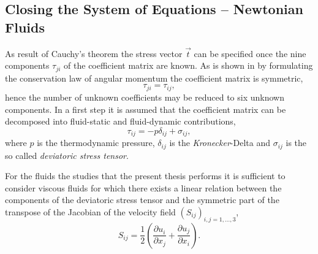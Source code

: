     \subsection{Closing the System of Equations -- Newtonian Fluids}
    \label{sec:fundclosing}

    As result of Cauchy's theorem the stress vector \( \vec{t} \) can be specified once the nine components \(\tau_{ji}\) of the coefficient matrix are known. As is shown in \cite{kundu12,spurk10} by formulating the conservation law of angular momentum the coefficient matrix is symmetric, 
    \begin{equation}
      \label{eq:stresssymetry}
      \tau_{ji} = \tau_{ij},
    \end{equation}
    hence the number of unknown coefficients may be reduced to six unknown components. In a first step it is assumed that the coefficient matrix can be decomposed into fluid-static and fluid-dynamic contributions,
    \begin{displaymath}
      \tau_{ij} = -p \delta_{ij} + \sigma_{ij},
    \end{displaymath}
    where \(p\) is the thermodynamic pressure, \(\delta_{ij}\) is the \emph{Kronecker}-Delta and \( \sigma_{ij} \) is the so called \emph{deviatoric stress tensor}. 
    
    For the fluids the studies that the present thesis performs it is sufficient to consider viscous fluids for which there exists a linear relation between the components of the deviatoric stress tensor and the symmetric part of the transpose of the Jacobian of the velocity field \(\left( S_{ij} \right)_{i,j=1,\dots,3}\),
    \begin{displaymath}
      S_{ij} = \frac{1}{2} \left( \frac{\partial u_i}{\partial x_j} + \frac{\partial u_j}{\partial x_i} \right).
    \end{displaymath}


